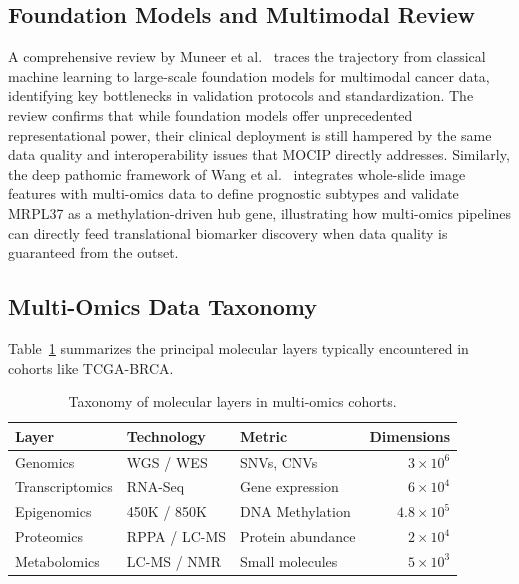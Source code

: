 \documentclass[twocolumn]{article}
\begin{document}
\subsection{Foundation Models and Multimodal Review}
A comprehensive review by Muneer et al.~\cite{muneer2025review} traces the trajectory from classical machine learning to large-scale foundation models for multimodal cancer data, identifying key bottlenecks in validation protocols and standardization. The review confirms that while foundation models offer unprecedented representational power, their clinical deployment is still hampered by the same data quality and interoperability issues that MOCIP directly addresses. Similarly, the deep pathomic framework of Wang et al.~\cite{wang2025deeppathomic} integrates whole-slide image features with multi-omics data to define prognostic subtypes and validate MRPL37 as a methylation-driven hub gene, illustrating how multi-omics pipelines can directly feed translational biomarker discovery when data quality is guaranteed from the outset.

\subsection{Multi-Omics Data Taxonomy}
Table~\ref{tab:taxonomy} summarizes the principal molecular layers typically encountered in cohorts like TCGA-BRCA.

\begin{table}[H]
\caption{Taxonomy of molecular layers in multi-omics cohorts.}\label{tab:taxonomy}
\centering
\small
\renewcommand{\arraystretch}{1.1}
\setlength{\tabcolsep}{4pt}
\begin{tabular}{p{1.9cm} p{1.4cm} p{1.6cm} r}
\toprule
\textbf{Layer} & \textbf{Technology} & \textbf{Metric} & \textbf{Dimensions} \\
\midrule
Genomics        & WGS / WES     & SNVs, CNVs        & $3 \times 10^6$ \\
Transcriptomics & RNA-Seq       & Gene expression   & $6 \times 10^4$ \\
Epigenomics     & 450K / 850K   & DNA Methylation   & $4.8 \times 10^5$ \\
Proteomics      & RPPA / LC-MS  & Protein abundance & $2 \times 10^4$ \\
Metabolomics    & LC-MS / NMR   & Small molecules   & $5 \times 10^3$ \\
\bottomrule
\end{tabular}
\end{table}
\end{document}
